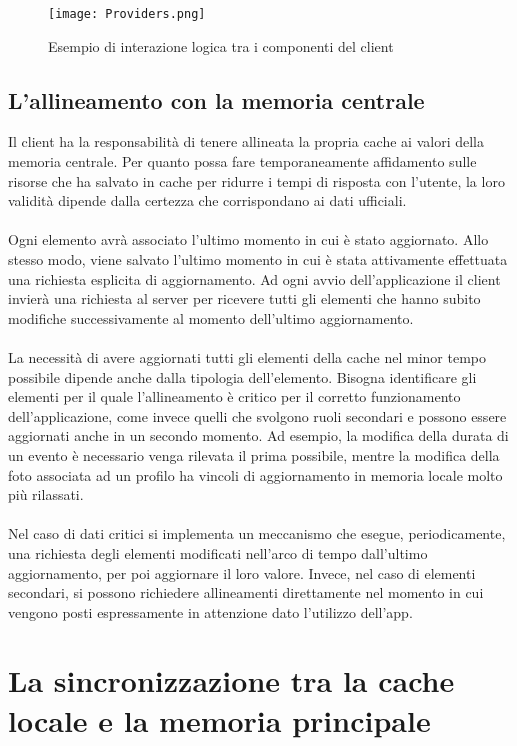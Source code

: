 \begin{figure}[h!]
    \centering
    \texttt{[image: Providers.png]}
    \caption{Esempio di interazione logica tra i componenti del client}
\end{figure}	
\clearpage

\subsection{L'allineamento con la memoria centrale}

Il client ha la responsabilità di tenere allineata la propria cache ai valori della memoria centrale. 
Per quanto possa fare temporaneamente affidamento sulle risorse che ha salvato in cache per ridurre i tempi di risposta con l’utente, 
la loro validità dipende dalla certezza che corrispondano ai dati ufficiali. \\
\\

Ogni elemento avrà associato l’ultimo momento in cui è stato aggiornato. 
Allo stesso modo, viene salvato l’ultimo momento in cui è stata attivamente effettuata una richiesta esplicita di aggiornamento.  
Ad ogni avvio dell’applicazione il client invierà una richiesta al server per ricevere tutti gli elementi che hanno subito modifiche successivamente al momento dell’ultimo aggiornamento.\\
\\
La necessità di avere aggiornati tutti gli elementi della cache nel minor tempo possibile dipende anche dalla tipologia dell’elemento. 
Bisogna identificare gli elementi per il quale l’allineamento è critico per il corretto funzionamento dell’applicazione, 
come invece quelli che svolgono ruoli secondari e possono essere aggiornati anche in un secondo momento. 
Ad esempio, la modifica della durata di un evento è necessario venga rilevata il prima possibile, 
mentre la modifica della foto associata ad un profilo ha vincoli di aggiornamento in memoria locale molto più rilassati.\\
\\
Nel caso di dati critici si implementa un meccanismo che esegue, periodicamente, una richiesta degli elementi modificati nell’arco di tempo dall’ultimo aggiornamento, 
per poi aggiornare il loro valore. Invece, nel caso di elementi secondari, 
si possono richiedere allineamenti direttamente nel momento in cui vengono posti espressamente in attenzione dato l’utilizzo dell’app.

\clearpage
\section{La sincronizzazione tra la cache locale e la memoria principale}

